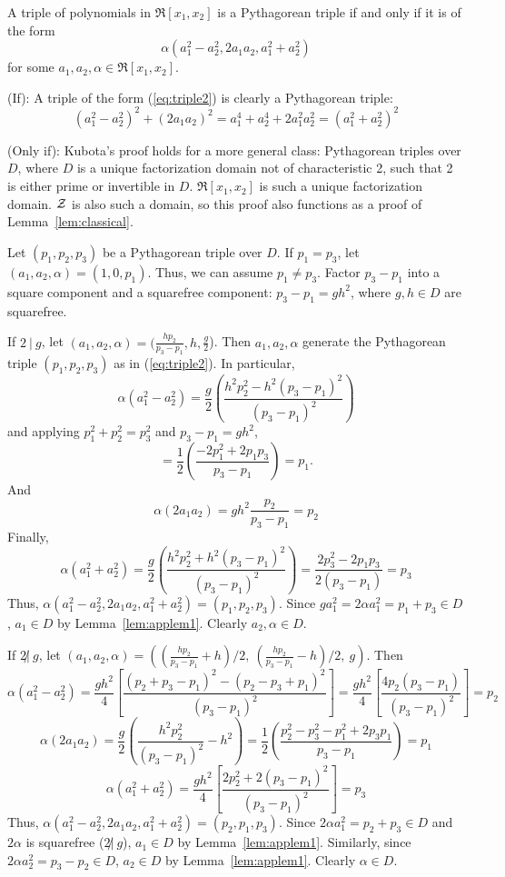 \begin{lemma}[Kubota 1972]
\label{lem:kubota2}
A triple of polynomials in $\Re[x_1,x_2]$ is a Pythagorean triple 
if and only if it is of the form 
\begin{equation}
\label{eq:triple2}
	\alpha(a_1^2 - a_2^2, 2a_1a_2, a_1^2 + a_2^2)
\end{equation}
for some $a_1,a_2,\alpha \in \Re[x_1,x_2]$.
\end{lemma}
\prf
(If):  A triple of the form (\ref{eq:triple2}) is clearly a Pythagorean triple:
\[
	(a_1^2 - a_2^2)^2 + (2a_1a_2)^2 = 
	a_1^4 + a_2^4 + 2a_1^2a_2^2 = (a_1^2 + a_2^2)^2
\]

(Only if): 
Kubota's proof holds for a more general class: Pythagorean triples
over $D$, where $D$ is a unique factorization domain 
not of characteristic 2, such that 2 is either prime 
or invertible in $D$.
$\Re[x_1,x_2]$ is such a unique factorization domain.
${\cal Z}$ is also such a domain, so this proof also functions
as a proof of Lemma~\ref{lem:classical}.

Let $(p_1,p_2,p_3)$ be a Pythagorean triple over $D$.
If $p_1=p_3$, let $(a_1,a_2,\alpha) = (1,0,p_1)$.
Thus, we can assume $p_1 \neq p_3$.
Factor $p_3 - p_1$ into a square component and a squarefree component:
$p_3 - p_1 = gh^2$, where $g,h \in D$ are squarefree.

If $2 \ | \ g$, let $(a_1,a_2,\alpha) = (\frac{hp_2}{p_3 - p_1}, h, \frac{g}{2}$).
Then $a_1,a_2,\alpha$ generate the Pythagorean triple $(p_1,p_2,p_3)$
as in (\ref{eq:triple2}).
In particular,
\[
\alpha (a_1^2 - a_2^2)
= \frac{g}{2} 
  (\frac{h^2p_2^2 - h^2(p_3 - p_1)^2}{(p_3-p_1)^2})
\]
and applying $p_1^2 + p_2^2 = p_3^2$ and $p_3 - p_1 = gh^2$,
\[
= \frac{1}{2} (\frac{-2p_1^2 + 2p_1p_3}{p_3 - p_1}) = p_1.
\]
And
\[
\alpha (2a_1 a_2) = gh^2 \frac{p_2}{p_3 - p_1} = p_2
\]
Finally, 
\[
\alpha(a_1^2 + a_2^2)
= \frac{g}{2} 
  (\frac{h^2p_2^2 + h^2(p_3 - p_1)^2}{(p_3-p_1)^2})
= \frac{2p_3^2 - 2p_1p_3}{2(p_3-p_1)} = p_3
\]
Thus, $\alpha (a_1^2 - a_2^2, 2a_1a_2, a_1^2 + a_2^2) = (p_1,p_2,p_3)$.
Since $ga_1^2 = 2 \alpha a_1^2 = p_1 + p_3 \in D$, 
$a_1 \in D$ by Lemma~\ref{lem:applem1}.
Clearly $a_2,\alpha \in D$.

If $2 \not | \ g$, let $(a_1,a_2,\alpha) = 
((\frac{hp_2}{p_3 - p_1} + h)/2, \ 
 (\frac{hp_2}{p_3 - p_1} - h)/2, \ g)$.
Then 
\[
\alpha (a_1^2 - a_2^2) = 
\frac{gh^2}{4}[\frac{(p_2+p_3-p_1)^2 - (p_2-p_3+p_1)^2}{(p_3-p_1)^2}] = 
\frac{gh^2}{4}[\frac{4p_2(p_3-p_1)}{(p_3-p_1)^2}] = 
p_2
\]
\[
\alpha (2a_1 a_2) = \frac{g}{2} (\frac{h^2p_2^2}{(p_3-p_1)^2} - h^2) = 
\frac{1}{2}(\frac{p_2^2 - p_3^2 - p_1^2 + 2p_3p_1}{p_3-p_1}) = 
p_1
\]
\[
\alpha(a_1^2 + a_2^2)
= \frac{gh^2}{4} [\frac{2p_2^2 + 2(p_3 - p_1)^2}{(p_3-p_1)^2}] = p_3
\]
Thus, $\alpha (a_1^2 - a_2^2, 2a_1a_2, a_1^2 + a_2^2) = (p_2,p_1,p_3)$.
Since $2 \alpha a_1^2 = p_2 + p_3 \in D$ and $2 \alpha$ is squarefree
($2 \not | \ g$), $a_1 \in D$ by Lemma~\ref{lem:applem1}.
Similarly, since $2 \alpha a_2^2 = p_3 - p_2 \in D$,
$a_2 \in D$ by Lemma~\ref{lem:applem1}.
Clearly $\alpha \in D$.
\QED

